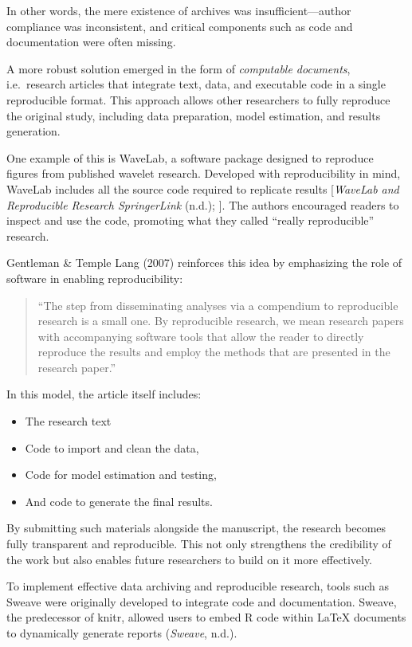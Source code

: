 \documentclass[
  a4paper,
]{article}
\providecommand{\tightlist}{%
  \setlength{\itemsep}{0pt}\setlength{\parskip}{0pt}}\usepackage{longtable,booktabs,array}
\begin{document}
In other words, the mere existence of archives was insufficient---author
compliance was inconsistent, and critical components such as code and
documentation were often missing.

A more robust solution emerged in the form of \emph{computable
documents}, i.e.~research articles that integrate text, data, and
executable code in a single reproducible format. This approach allows
other researchers to fully reproduce the original study, including data
preparation, model estimation, and results generation.

One example of this is WaveLab, a software package designed to reproduce
figures from published wavelet research. Developed with reproducibility
in mind, WaveLab includes all the source code required to replicate
results {[}\emph{WaveLab and Reproducible Research \textbar{}
SpringerLink} (n.d.); {]}. The authors encouraged readers to inspect and
use the code, promoting what they called ``really reproducible''
research.

Gentleman \& Temple Lang (2007) reinforces this idea by emphasizing the
role of software in enabling reproducibility:

\begin{quote}
``The step from disseminating analyses via a compendium to reproducible
research is a small one. By reproducible research, we mean research
papers with accompanying software tools that allow the reader to
directly reproduce the results and employ the methods that are presented
in the research paper.''
\end{quote}

In this model, the article itself includes:

\begin{itemize}
\tightlist
\item
  The research text
\item
  Code to import and clean the data,
\item
  Code for model estimation and testing,
\item
  And code to generate the final results.
\end{itemize}

By submitting such materials alongside the manuscript, the research
becomes fully transparent and reproducible. This not only strengthens
the credibility of the work but also enables future researchers to build
on it more effectively.

To implement effective data archiving and reproducible research, tools
such as Sweave were originally developed to integrate code and
documentation. Sweave, the predecessor of knitr, allowed users to embed
R code within LaTeX documents to dynamically generate reports
(\emph{Sweave}, n.d.).
\end{document}

